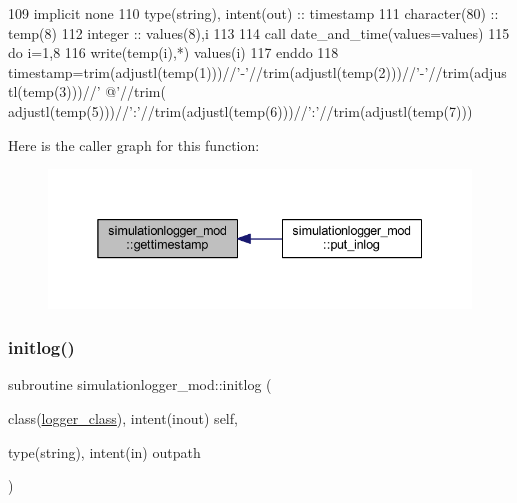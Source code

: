 \begin{DoxyCode}
109     \textcolor{keywordtype}{implicit none}
110     \textcolor{keywordtype}{type}(string), \textcolor{keywordtype}{intent(out)} :: timestamp
111     \textcolor{keywordtype}{character(80)} :: temp(8)
112     \textcolor{keywordtype}{integer} :: values(8),i
113 
114     \textcolor{keyword}{call }date\_and\_time(values=values)
115     \textcolor{keywordflow}{do} i=1,8
116         \textcolor{keyword}{write}(temp(i),*) values(i)
117 \textcolor{keywordflow}{    enddo}
118     timestamp=trim(adjustl(temp(1)))//\textcolor{stringliteral}{'-'}//trim(adjustl(temp(2)))//\textcolor{stringliteral}{'-'}//trim(adjustl(temp(3)))//\textcolor{stringliteral}{' @'}//trim(
      adjustl(temp(5)))//\textcolor{stringliteral}{':'}//trim(adjustl(temp(6)))//\textcolor{stringliteral}{':'}//trim(adjustl(temp(7)))
\end{DoxyCode}
Here is the caller graph for this function\+:\nopagebreak
\begin{figure}[H]
\begin{center}
\leavevmode
\includegraphics[width=338pt]{namespacesimulationlogger__mod_abff1db7e1655cb59097146d78e650672_icgraph}
\end{center}
\end{figure}
\mbox{\label{namespacesimulationlogger__mod_aeb57075501eed504789bb5858b4e6b59}} 
\subsubsection{\texorpdfstring{initlog()}{initlog()}}
{\footnotesize\ttfamily subroutine simulationlogger\+\_\+mod\+::initlog (\begin{DoxyParamCaption}\item[{class(\mbox{\hyperlink{structsimulationlogger__mod_1_1logger__class}{logger\+\_\+class}}), intent(inout)}]{self,  }\item[{type(string), intent(in)}]{outpath }\end{DoxyParamCaption})\hspace{0.3cm}{\ttfamily [private]}}



